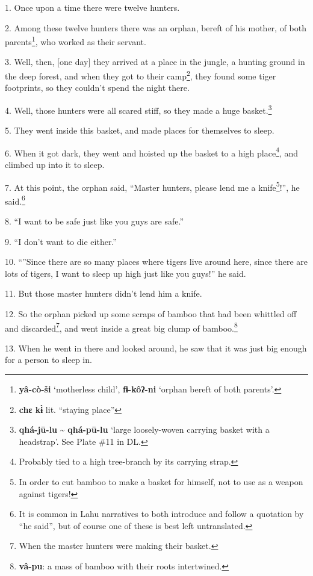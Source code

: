 \setcounter{footnote}{0}

1. Once upon a time there were twelve hunters.

2. Among these twelve hunters there was an orphan, bereft of his mother, of both
parents\footnote{\textbf{yâ-cò-ši} `motherless child', \textbf{fɨ-kôʔ-ni} `orphan bereft of both parents'.}, who worked as their servant.

3. Well, then, [one day] they arrived at a place in the jungle, a hunting ground
in the deep forest, and when they got to their camp\footnote{\textbf{chɛ kɨ̀} lit. ``staying place''}, they found some tiger
footprints, so they couldn't spend the night there.

4. Well, those hunters were all scared stiff, so they made a huge basket.\footnote{\textbf{qhá-jū-lu} \textasciitilde{} \textbf{qhá-pū-lu} `large loosely-woven carrying basket with a headstrap'. See Plate \#11 in DL.}

5. They went inside this basket, and made places for themselves to sleep.

6. When it got dark, they went and hoisted up the basket to a high place\footnote{Probably tied to a high tree-branch by its carrying strap.}, and
climbed up into it to sleep.

7. At this point, the orphan said, ``Master hunters, please lend me a knife\footnote{In order to cut bamboo to make a basket for himself, not to use as a weapon against tigers!}!'',
he said.\footnote{It is common in Lahu narratives to both introduce and follow a quotation by ``he said'', but of course one of these is best left untranslated.}

8. ``I want to be safe just like you guys are safe.''

9. ``I don't want to die either.''

10. ``''Since there are so many places where tigers live around here, since
there are lots of tigers, I want to sleep up high just like you guys!'' he said.

11. But those master hunters didn't lend him a knife.

12. So the orphan picked up some scraps of bamboo that had been whittled off and
discarded\footnote{When the master hunters were making their basket.}, and went inside a great big clump of bamboo.\footnote{\textbf{vâ-pu}: a mass of bamboo with their roots intertwined.}

13. When he went in there and looked around, he saw that it was just big enough
for a person to sleep in.

